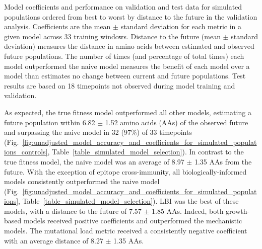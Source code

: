\begin{table}[ht]
  \begin{center}
    \scalebox{0.9}{
      
    }
    \caption{
      Model coefficients and performance on validation and test data for simulated populations ordered from best to worst by distance to the future in the validation analysis.
      Coefficients are the mean $\pm$ standard deviation for each metric in a given model across 33 training windows.
      Distance to the future (mean $\pm$ standard deviation) measures the distance in amino acids between estimated and observed future populations.
      The number of times (and percentage of total times) each model outperformed the naive model measures the benefit of each model over a model than estimates no change between current and future populations.
      Test results are based on 18 timepoints not observed during model training and validation.
    }
    \label{table_simulated_model_selection}
  \end{center}
\end{table}

As expected, the true fitness model outperformed all other models, estimating a future population within 6.82 $\pm$ 1.52 amino acids (AAs) of the observed future and surpassing the naive model in 32 (97\%) of 33 timepoints (Fig.~\ref{fig:unadjusted_model_accuracy_and_coefficients_for_simulated_populations_controls}, Table~\ref{table_simulated_model_selection}).
In contrast to the true fitness model, the naive model was an average of 8.97 $\pm$ 1.35 AAs from the future.
With the exception of epitope cross-immunity, all biologically-informed models consistently outperformed the naive model (Fig.~\ref{fig:unadjusted_model_accuracy_and_coefficients_for_simulated_populations}, Table~\ref{table_simulated_model_selection}).
LBI was the best of these models, with a distance to the future of 7.57 $\pm$ 1.85 AAs.
Indeed, both growth-based models received positive coefficients and outperformed the mechanistic models.
The mutational load metric received a consistently negative coefficient with an average distance of 8.27 $\pm$ 1.35 AAs.

